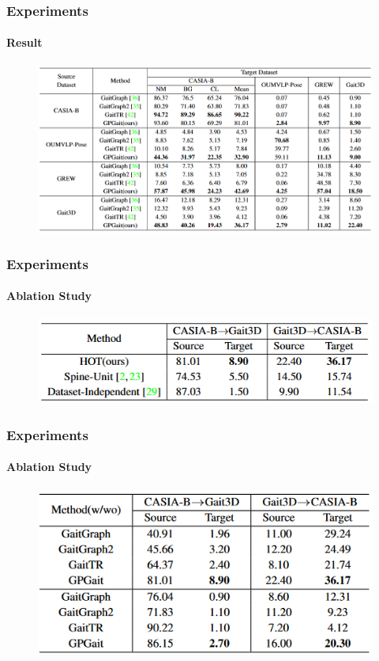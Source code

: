 \documentclass[
	12pt, %
	aspectratio=169, %
]{beamer}
\begin{document}
\begin{frame}
	\frametitle{Experiments}
	\framesubtitle{Result}

	\begin{figure}
		\centering
		\includegraphics[width=0.8\linewidth]{"./Images/cross_domain_result.png"}
	\end{figure}
\end{frame}

\begin{frame}
	\frametitle{Experiments}
	\framesubtitle{Ablation Study}

	\begin{figure}
		\centering
		\includegraphics[width=0.8\linewidth]{"./Images/hot_ablation.png"}
	\end{figure}
\end{frame}

\begin{frame}
	\frametitle{Experiments}
	\framesubtitle{Ablation Study}

	\begin{figure}
		\centering
		\includegraphics[width=0.8\linewidth]{"./Images/hot_ablation_2.png"}
	\end{figure}
\end{frame}
\end{document}
